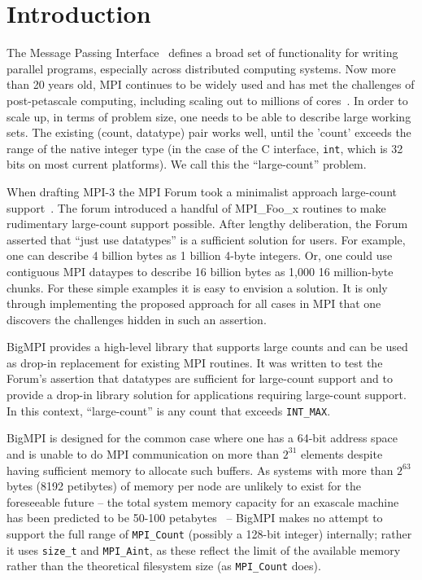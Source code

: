 
\section{Introduction}

The Message Passing Interface~\cite{mpiforum:94, mpiforum:96, mpiforum:09, mpiforum:12} 
defines a broad set of functionality for writing parallel programs, especially across
distributed computing systems.
Now more than 20 years old, MPI continues to be widely used and has met the challenges of
post-petascale computing, including scaling out to millions of cores~\cite{balaji2011mpi}. 
In order to scale up, in terms of problem size, one needs
to be able to describe large working sets.  The existing (count, datatype) pair
works well, until the 'count' exceeds the range of the native integer type
(in the case of the C interface, \texttt{int}, which is 32 bits on most current platforms).
We call this the ``large-count'' problem.

When drafting MPI-3 the MPI Forum took a minimalist approach large-count 
support~\cite{squyres-blog-large-count,ticket265}.
The forum introduced a handful of MPI\_Foo\_x routines to make rudimentary
large-count support possible.  After lengthy deliberation, the
Forum asserted that ``just use datatypes'' is a sufficient solution for users.
For example, one can describe 4 billion bytes as 1 billion 4-byte integers.
Or, one could use contiguous MPI dataypes to describe 16 billion bytes as 1,000
16 million-byte chunks.  For these simple examples it is easy to envision a
solution. It is only through implementing the proposed approach for all cases
in MPI that one discovers the challenges hidden in such an assertion.

BigMPI provides a high-level library that supports large counts and can be used as 
drop-in replacement for existing MPI routines.  It was written to test the Forum's assertion
that datatypes are sufficient for large-count support and to provide a drop-in library
solution for applications requiring large-count support.
In this context, ``large-count'' is any count that exceeds \texttt{INT\_MAX}. 

BigMPI is designed for the common case where one has a 64-bit address
space and is unable to do MPI communication on more than $2^{31}$ elements
despite having sufficient memory to allocate such buffers.
As systems with more than $2^{63}$ bytes (8192 petibytes) of memory 
per node are unlikely to exist for the foreseeable future --
the total system memory capacity for an exascale machine has been 
predicted to be 50-100 petabytes~\cite{shalf2011exascale} --
BigMPI makes no attempt to support the full range of \texttt{MPI\_Count}
(possibly a 128-bit integer) internally; rather it uses \texttt{size\_t}
and \texttt{MPI\_Aint}, as these reflect the limit of the available memory
rather than the theoretical filesystem size (as \texttt{MPI\_Count} does).